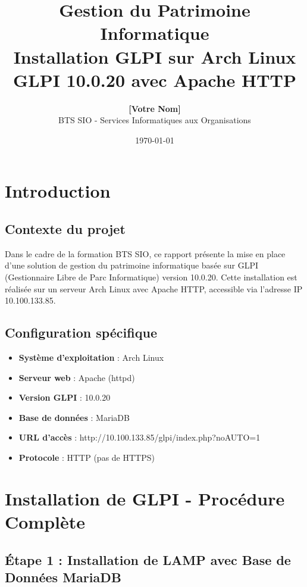 \documentclass[12pt,a4paper]{article}
\title{
    \LARGE{\textbf{Gestion du Patrimoine Informatique}} \\
    \Large{Installation GLPI sur Arch Linux} \\
    \Large{GLPI 10.0.20 avec Apache HTTP}
}
\author{
    \textbf{[Votre Nom]} \\
    BTS SIO - Services Informatiques aux Organisations
}
\date{\today}
\begin{document}
\maketitle
\thispagestyle{empty}

\newpage
\tableofcontents
\newpage

\section{Introduction}

\subsection{Contexte du projet}
Dans le cadre de la formation BTS SIO, ce rapport présente la mise en place d'une solution de gestion du patrimoine informatique basée sur GLPI (Gestionnaire Libre de Parc Informatique) version 10.0.20. Cette installation est réalisée sur un serveur Arch Linux avec Apache HTTP, accessible via l'adresse IP 10.100.133.85.

\subsection{Configuration spécifique}
\begin{itemize}
    \item \textbf{Système d'exploitation} : Arch Linux
    \item \textbf{Serveur web} : Apache (httpd)
    \item \textbf{Version GLPI} : 10.0.20
    \item \textbf{Base de données} : MariaDB
    \item \textbf{URL d'accès} : http://10.100.133.85/glpi/index.php?noAUTO=1
    \item \textbf{Protocole} : HTTP (pas de HTTPS)
\end{itemize}

\section{Installation de GLPI - Procédure Complète}

\subsection{Étape 1 : Installation de LAMP avec Base de Données MariaDB}
\end{document}
